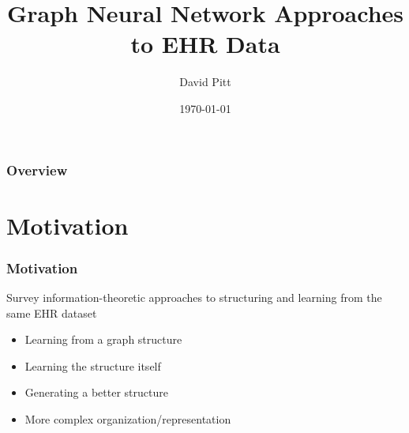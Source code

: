\documentclass{beamer}
\title[MATH 189AC Final]{Graph Neural Network Approaches to EHR Data} %
\author{David Pitt} %
\institute[HMC Math 189AC] %
{
HMC Math 189AC \\ %
\medskip
\textit{dpitt@g.hmc.edu} %
}
\date{\today} %
\begin{document}
\begin{frame}
\titlepage %
\end{frame}

\begin{frame}
\frametitle{Overview} %
\tableofcontents %
\end{frame}


\section{Motivation} %



\begin{frame}
    \frametitle{Motivation}
   	Survey information-theoretic approaches to structuring and learning from the same EHR dataset
    
    \begin{itemize}
        \item Learning from a graph structure
        \item Learning the structure itself
        \item Generating a better structure
        \item More complex organization/representation
    \end{itemize}
    

    \end{frame}
\end{document}
